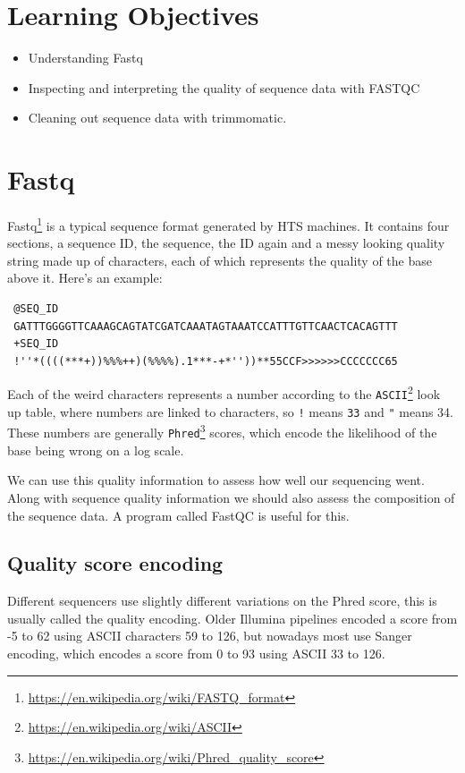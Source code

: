 \documentclass[12pt,]{book}
\providecommand{\tightlist}{%
  \setlength{\itemsep}{0pt}\setlength{\parskip}{0pt}}
\let\rmarkdownfootnote\footnote%
\def\footnote{\protect\rmarkdownfootnote}
\renewcommand{\href}[2]{#2\footnote{\url{#1}}}
\theoremstyle{definition}
\theoremstyle{definition}
\theoremstyle{remark}
\begin{document}
\section{Learning Objectives}\label{learning-objectives-1}

\begin{itemize}
\tightlist
\item
  Understanding Fastq
\item
  Inspecting and interpreting the quality of sequence data with FASTQC
\item
  Cleaning out sequence data with trimmomatic.
\end{itemize}

\section{Fastq}\label{fastq}

\href{https://en.wikipedia.org/wiki/FASTQ_format}{Fastq} is a typical
sequence format generated by HTS machines. It contains four sections, a
sequence ID, the sequence, the ID again and a messy looking quality
string made up of characters, each of which represents the quality of
the base above it. Here's an example:

\begin{verbatim}
 @SEQ_ID
 GATTTGGGGTTCAAAGCAGTATCGATCAAATAGTAAATCCATTTGTTCAACTCACAGTTT
 +SEQ_ID
 !''*((((***+))%%%++)(%%%%).1***-+*''))**55CCF>>>>>>CCCCCCC65
\end{verbatim}

Each of the weird characters represents a number according to the
\href{https://en.wikipedia.org/wiki/ASCII}{\texttt{ASCII}} look up
table, where numbers are linked to characters, so \texttt{!} means
\texttt{33} and \texttt{"} means 34. These numbers are generally
\href{https://en.wikipedia.org/wiki/Phred_quality_score}{\texttt{Phred}}
scores, which encode the likelihood of the base being wrong on a log
scale.

We can use this quality information to assess how well our sequencing
went. Along with sequence quality information we should also assess the
composition of the sequence data. A program called FastQC \citep{FastQC}
is useful for this.

\subsection{Quality score encoding}\label{quality-score-encoding}

Different sequencers use slightly different variations on the Phred
score, this is usually called the quality encoding. Older Illumina
pipelines encoded a score from -5 to 62 using ASCII characters 59 to
126, but nowadays most use Sanger encoding, which encodes a score from 0
to 93 using ASCII 33 to 126.
\end{document}
